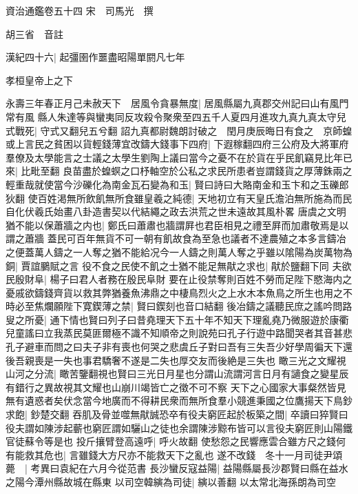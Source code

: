 資治通鑑卷五十四
宋　司馬光　撰

胡三省　音註

漢紀四十六|{
	起彊圉作噩盡昭陽單閼凡七年}


孝桓皇帝上之下

永壽三年春正月己未赦天下　居風令貪暴無度|{
	居風縣屬九真郡交州記曰山有風門常有風}
縣人朱達等與蠻夷同反攻殺令聚衆至四五千人夏四月進攻九真九真太守兒式戰死|{
	守式又翻兒五兮翻}
詔九真都尉魏朗討破之　閏月庚辰晦日有食之　京師蝗　或上言民之貧困以貨輕錢薄宜改鑄大錢事下四府|{
	下遐稼翻四府三公府及大將軍府}
羣僚及太學能言之士議之太學生劉陶上議曰當今之憂不在於貨在乎民飢竊見比年已來|{
	比毗至翻}
良苗盡於蝗螟之口杼軸空於公私之求民所患者豈謂錢貨之厚薄銖兩之輕重哉就使當今沙礫化為南金瓦石變為和玉|{
	賢曰詩曰大賂南金和玉卞和之玉礫郎狄翻}
使百姓渇無所飲飢無所食雖皇羲之純德|{
	天地初立有天皇氏澹泊無所施為而民自化伏羲氏始畫八卦造書契以代結繩之政去洪荒之世未遠故其風朴畧}
唐虞之文明猶不能以保蕭牆之内也|{
	鄭氏曰蕭肅也牆謂屛也君臣相見之禮至屛而加肅敬焉是以謂之蕭牆}
蓋民可百年無貨不可一朝有飢故食為至急也議者不達農殖之本多言鑄冶之便蓋萬人鑄之一人奪之猶不能給况今一人鑄之則萬人奪之乎雖以隂陽為炭萬物為銅|{
	賈誼鵩賦之言}
役不食之民使不飢之士猶不能足無猒之求也|{
	猒於鹽翻下同}
夫欲民殷財阜|{
	楊子曰君人者務在殷民阜財}
要在止役禁奪則百姓不勞而足陛下愍海内之憂戚欲鑄錢齊貨以救其弊猶養魚沸鼎之中棲鳥烈火之上水木本魚鳥之所生也用之不時必至焦爛願陛下寛鍥薄之禁|{
	賢曰鍥刻也音口結翻}
後冶鑄之議聽民庶之謠吟問路叟之所憂|{
	通下情也賢曰列子曰昔堯理天下五十年不知天下理亂堯乃微服遊於康衢兒童謠曰立我蒸民莫匪爾極不識不知順帝之則說苑曰孔子行遊中路聞哭者其音甚悲孔子避車而問之曰夫子非有喪也何哭之悲虞丘子對曰吾有三失吾少好學周徧天下還後吾親喪是一失也事君驕奢不遂是二失也厚交友而後絶是三失也}
瞰三光之文耀視山河之分流|{
	瞰苦鑒翻視也賢曰三光日月星也分謂山流謂河言日月有讁食之變星辰有錯行之異故視其文耀也山崩川竭皆亡之徵不可不察}
天下之心國家大事粲然皆見無有遺惑者矣伏念當今地廣而不得耕民衆而無所食羣小競進秉國之位鷹揚天下鳥鈔求飽|{
	鈔楚交翻}
吞肌及骨並噬無猒誠恐卒有役夫窮匠起於板築之間|{
	卒讀曰猝賢曰役夫謂如陳涉起蘄也窮匠謂如驪山之徒也余謂陳涉黥布皆可以言役夫窮匠則山陽鐵官徒蘇令等是也}
投斤攘臂登高遠呼|{
	呼火故翻}
使愁怨之民響應雲合雖方尺之錢何有能救其危也|{
	言雖錢大方尺亦不能救天下之亂也}
遂不改錢　冬十一月司徒尹頌薨　|{
	考異曰袁紀在六月今從范書}
長沙蠻反寇益陽|{
	益陽縣屬長沙郡賢曰縣在益水之陽今潭州縣故城在縣東}
以司空韓縯為司徒|{
	縯以善翻}
以太常北海孫朗為司空

